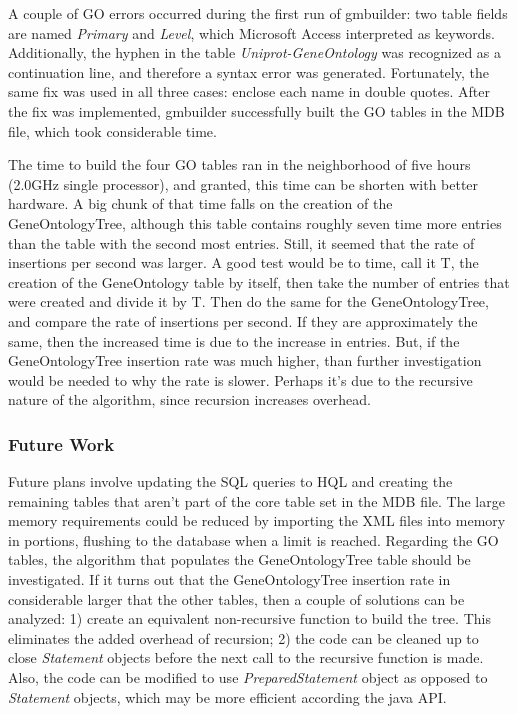 A couple of GO errors occurred during the first run of gmbuilder: two table fields are named \emph{Primary} and \emph{Level}, which
Microsoft Access interpreted as keywords. Additionally, the hyphen in the table \emph{Uniprot-GeneOntology}
was recognized  as a continuation line, and therefore a syntax error was generated. Fortunately, the same fix was used
in all three cases: enclose each name in double quotes. After the fix was implemented, gmbuilder successfully built the
GO tables in the MDB file, which took considerable time.

The time to build the four GO tables ran in the neighborhood of five hours (2.0GHz single processor), and
granted, this time can be shorten with better hardware. A big chunk of that time falls on the creation of the
GeneOntologyTree, although this table contains roughly seven time more entries than the table with the second
most entries. Still, it seemed that the rate of insertions per second was larger.
A good test would be to time, call it T, the creation of the
GeneOntology table by itself, then take the number of entries that were created and divide it by T. Then do the same for the
GeneOntologyTree, and compare the rate of insertions per second. If they are approximately the same, then the increased time
is due to the increase in entries. But, if the GeneOntologyTree insertion rate was much higher, than further investigation would be
needed to why the rate is slower. Perhaps it's due to the recursive nature of the algorithm, since recursion increases overhead.


\subsubsection{Future Work}
Future plans involve updating the SQL queries to HQL and creating the remaining tables that aren't part of the core table set in the MDB file. The large memory requirements could be reduced by importing the XML files into memory in portions, flushing to the database when a limit is reached. Regarding the GO tables, the algorithm that populates the GeneOntologyTree table should be investigated.
If it turns out that the GeneOntologyTree insertion rate in considerable larger that the other tables, then
a couple of solutions can be analyzed: 1) create an equivalent non-recursive function to build the tree. This
eliminates the added overhead of recursion; 2) the code can be cleaned up to
close \emph{Statement} objects before the next call to the recursive function is made. Also, the code can
be modified to use \emph{PreparedStatement} object as opposed to \emph{Statement} objects, which may be more
efficient according the java API.


